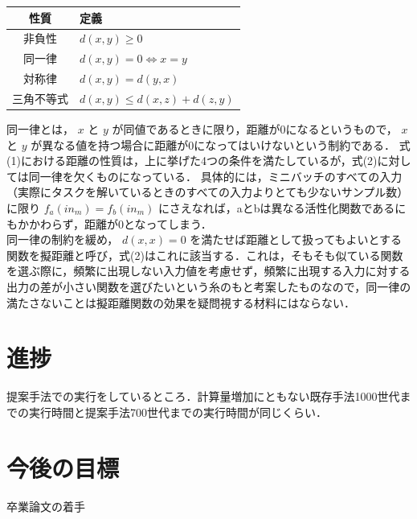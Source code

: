 \documentclass[dvipdfmx]{jarticle}
\begin{document}
\begin{tabular}{cl}
    \hline
    性質  & 定義 \\
    \hline \hline
    非負性 & $d(x, y) \geq 0$ \\
    同一律 & $d(x, y) = 0 \Leftrightarrow x = y$ \\
    対称律 & $d(x, y) = d(y, x)$ \\
    三角不等式 & $d(x, y) \leq d(x, z) + d(z, y)$ \\
    \hline
\end{tabular}

同一律とは， $ x $ と $ y $ が同値であるときに限り，距離が0になるというもので， $ x $ と $ y $ が異なる値を持つ場合に距離が0になってはいけないという制約である．
式(1)における距離の性質は，上に挙げた4つの条件を満たしているが，式(2)に対しては同一律を欠くものになっている．
具体的には，ミニバッチのすべての入力（実際にタスクを解いているときのすべての入力よりとても少ないサンプル数）に限り $ f_{a}(in_{m}) = f_{b}(in_{m}) $ にさえなれば，aとbは異なる活性化関数であるにもかかわらず，距離が0となってしまう．\\
同一律の制約を緩め， $ d(x, x) = 0 $ を満たせば距離として扱ってもよいとする関数を擬距離と呼び，式(2)はこれに該当する．これは，そもそも似ている関数を選ぶ際に，頻繁に出現しない入力値を考慮せず，頻繁に出現する入力に対する出力の差が小さい関数を選びたいという糸のもと考案したものなので，同一律の満たさないことは擬距離関数の効果を疑問視する材料にはならない．

\section{進捗}
提案手法での実行をしているところ．計算量増加にともない既存手法1000世代までの実行時間と提案手法700世代までの実行時間が同じくらい．

\section{今後の目標}
卒業論文の着手
\end{document}
